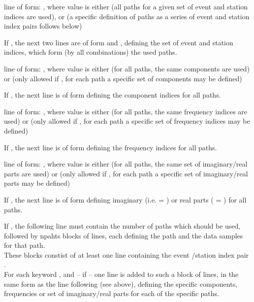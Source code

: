 line of form: , where value is either  (all paths for a given set of event and station indices
are used), or  (a specific definition of paths as a series of event and station index pairs follows below)

If , the next two lines are of form  and , defining the set
of event and station indices, which form (by all combinations) the used paths. 

line of form: , where value is either  (for all paths, the same components are used) or 
(only allowed if , for each path a specific set of components may be defined)

If , the next line is of form  defining the component indices for all paths.

line of form: , where value is either  (for all paths, the same frequency indices are used) or 
(only allowed if , for each path a specific set of frequency indices may be defined)

If , the next line is of form  defining the frequency indices for all paths.

line of form: , where value is either  (for all paths, the same set of imaginary/real parts are used) or 
(only allowed if , for each path a specific set of imaginary/real parts may be defined)

If , the next line is of form  defining imaginary (i.e.  = ) or real parts 
( = ) for all paths.

If , the following line must contain the number  of paths which should be used, followed by 
npahts blocks of lines, each defining the path and the data samples for that path. \\
These blocks constist of at least one line containing the event /station index pair . \\
For each keyword ,  and  -- if  -- one line is added to such a block 
of lines, in the same form as the line following  (see above), 
defining the specific components, frequencies or set of imaginary/real parts for each of the specific paths.
%

